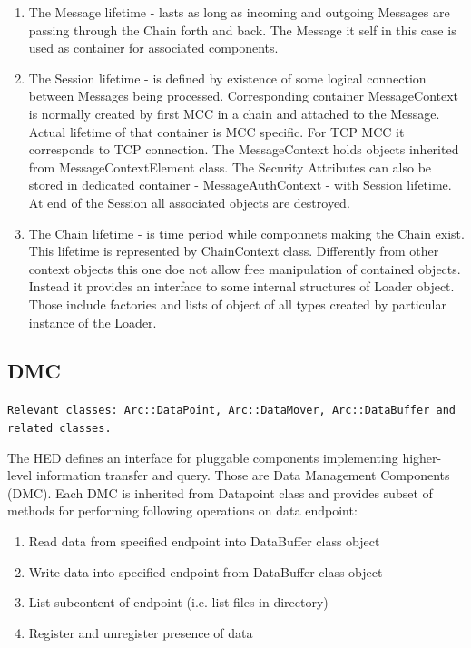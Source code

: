 \documentclass{book}
\begin{document}
\begin{enumerate}

\item The Message lifetime - lasts as long as incoming and outgoing Messages are passing through the Chain forth and back. The Message it self in this case is used as container for associated components.

\item The Session lifetime - is defined by existence of some logical connection between Messages being processed. Corresponding container MessageContext is normally created by first MCC in a chain and attached to the Message. Actual lifetime of that container is MCC specific. For TCP MCC it corresponds to TCP connection. The MessageContext holds objects inherited from MessageContextElement class. The Security Attributes can also be stored in dedicated container - MessageAuthContext - with Session lifetime. At end of  the Session all associated objects are destroyed.

\item The Chain lifetime - is time period while componnets making the Chain exist. This lifetime is represented by ChainContext class. Differently from other context objects this one doe not allow free manipulation of contained objects. Instead it provides an interface to some internal structures of Loader object. Those include factories and lists of object of all types created by particular instance of the Loader.

\end{enumerate}


\subsection{DMC}

\texttt{Relevant classes: Arc::DataPoint, Arc::DataMover, Arc::DataBuffer and related classes.}

The HED defines an interface for pluggable components implementing higher-level information transfer and query. Those are Data Management Components (DMC). Each DMC is inherited from Datapoint class and provides subset of methods for performing following operations on data endpoint:

\begin{enumerate}

\item Read data from specified endpoint into DataBuffer class object

\item Write data into specified endpoint from DataBuffer class object

\item List subcontent of endpoint (i.e. list files in directory)

\item Register and unregister presence of data

\end{enumerate}
\end{document}
